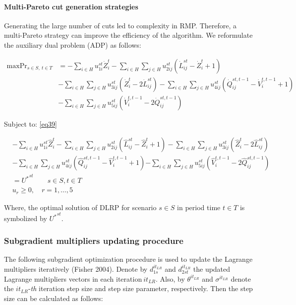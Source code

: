 \documentclass[review]{elsarticle}
\begin{document}
\paragraph{Multi-Pareto cut generation strategies}

Generating the large number of cuts led to complexity in RMP. Therefore, a multi-Pareto strategy can improve the efficiency of the algorithm. We reformulate the auxiliary dual problem (ADP) as follows:

\begin{align}\label{eq50}
\mathop{\max Prt^{st}}_{s\in S,\ t\in T}&=-\sum_{i\in H}{u^{st}_{1i}{\dot{Z}}^t_i}-\sum_{i\in H}{\sum_{j\in H}{u^{st}_{2ij}\left({\dot{L}}^{st}_{ij}-{\dot{Z}}^t_i+1\right)}}\\
&-\sum_{i\in H}{\sum_{j\in H}{u^{st}_{3ij}\left({\dot{Z}}^t_i-2{\dot{L}}^{st}_{ij}\right)}}-\sum_{i\in H}{\sum_{j\in H}{u^{st}_{4ij}\left({\dot{Q}}^{st,t-1}_{ij}-{\dot{V}}^{t,t-1}_i+1\right)}}\nonumber\\
&-\sum_{i\in H}{\sum_{j\in H}{u^{st}_{5ij}\left({\dot{V}}^{t,t-1}_i-2{\dot{Q}}^{st,t-1}_{ij}\right)}}\nonumber
\end{align}

Subject to: \eqref{eq39}

\begin{align}\label{eq51}
&-\sum_{i\in H}{u^{st}_{1i}{\hat{Z}}^t_i}-\sum_{i\in H}{\sum_{j\in H}{u^{st}_{2ij}\left({\hat{L}}^{st}_{ij}-{\hat{Z}}^t_i+1\right)}}-\sum_{i\in H}{\sum_{j\in H}{u^{st}_{3ij}\left({\hat{Z}}^t_i-2{\hat{L}}^{st}_{ij}\right)}}\\
&-\sum_{i\in H}{\sum_{j\in H}{u^{st}_{4ij}\left({\hat{Q}}^{st,t-1}_{ij}-{\hat{V}}^{t,t-1}_i+1\right)}}\mathbf{ -}\sum_{i\in H}{\sum_{j\in H}{u^{st}_{5ij}\left({\hat{V}}^{t,t-1}_i-2{\hat{Q}}^{st,t-1}_{ij}\right)}}\nonumber\\
&={U^*}^{st}\qquad s\in S, t\in T\nonumber\\
&u_r \geq 0,\quad r=1,\ldots ,5\nonumber
\end{align}

Where, the optimal solution of DLRP for scenario $s\in S$ in period time $t\in T$ is symbolized by ${U^*}^{st}$.

\subsubsection{Subgradient multipliers updating procedure}

The following subgradient optimization procedure is used to update the Lagrange multipliers iteratively (Fisher 2004). Denote by $d^{{it}_{LR}}_{1s}$ and $d^{{it}_{LR}}_{2st}$ the updated Lagrange multipliers vectors in each iteration$\ it_{LR}$. Also, by ${\theta }^{{it}_{LR}}$ and ${\sigma }^{{it}_{LR}}$ denote the ${it}_{LR}$-\textit{th} iteration step size and step size parameter, respectively. Then the step size can be calculated as follows:
\end{document}
